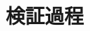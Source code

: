 \documentclass[technicalreport]{ieicej}
\theoremstyle{plain}
\begin{document}
\begin{comment}
例として，単純なコンセンサスアルゴリズであるOne-third-ruleアルゴリズム~\cite{HOjournal}を取り上げる (Algorithm~1). 
このアルゴリズムでは，プロセスの状態は決定する値の候補を表している．
各ラウンドでプロセスは自分の状態をブロードキャストしたのち，
ブロードキャストされたメッセージを受信した結果，3分の2より多くのプロセスが
同じ値を提案値の候補と考えているのが分かれば，その値で決定を行う．
そうでない場合は，最も多くのプロセスが候補として考えている値を，新たな候補値として選択する．
もし，そのような値が複数ある場合は，それらにおける最小値を選択する．
\begin{algorithm}[ht]
    \normalsize{
        \begin{distribalgo}[1]
           
            \INDENT{\textbf{initialization}}
            \STATE{$x_i :=$ 提案値$v_i$} \\ 
            \ENDINDENT 
            \BLANK
            
            \INDENT{\textbf{Round}~$r$} 
            \STATE{send $x_i$ to all processes} \\
            \IF{受信したメッセージ数 $> 2n/3$}
            \STATE{$x_i :=$ 受信した値の最小値のうち，最も受信数の多いもの} \\
\IF{受信した値で$2n/3$を超える値ものが一致}
\STATE{この一致する値で決定}
\ENDIF
            \ENDIF

            \ENDINDENT
            \caption{One-third-ruleアルゴリズム}
            \label{algo:bakery}
        \end{distribalgo}
    }
\end{algorithm}


\end{comment}
    

\section{検証過程}\label{sec:clang}
\end{document}
